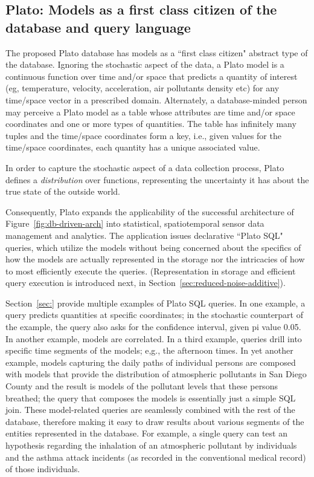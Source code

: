 \subsection{Plato: Models as a first class citizen of the database and query language}
\label{sec:plato}
The proposed Plato database has models as a ``first class citizen"
abstract type of the database. Ignoring the stochastic aspect of the
data, a Plato model is a continuous function over time and/or space
that predicts a quantity of interest (eg, temperature, velocity,
acceleration, air pollutants density etc) for any time/space vector in
a prescribed domain. Alternately, a database-minded person may
perceive a Plato model as a table whose attributes are time and/or
space coordinates and one or more types of quantities. The table has
infinitely many tuples and the time/space coordinates form a key,
i.e., given values for the time/space coordinates, each quantity has a
unique associated value.  

In order to capture the stochastic aspect of a data collection
process, Plato defines a {\em distribution} over functions,
representing the uncertainty it has about the true state of the
outside world.


Consequently, Plato expands the applicability of the successful
architecture of Figure~\ref{fig:db-driven-arch} into statistical,
spatiotemporal sensor data management and analytics. The application
issues declarative ``Plato SQL" queries, which utilize the models
without being concerned about the specifics of how the models are
actually represented in the storage nor the intricacies of how to most
efficiently execute the queries. (Representation in storage and
efficient query execution is introduced next, in
Section~\ref{sec:reduced-noise-additive}). 

Section~\ref{sec:} provide multiple examples of Plato SQL queries. In one example, a query predicts quantities at specific coordinates; in the stochastic counterpart of the example, the query also asks for the confidence interval, given pi value 0.05. In another example, models are correlated. In a third example, queries drill into specific time segments of the models; e,g., the afternoon times. In yet another example, models capturing the daily paths of individual persons are composed with models that provide the distribution of atmospheric pollutants in San Diego County and the result is models of the pollutant levels that these persons breathed; the query that composes the models is essentially just a simple SQL join. These model-related queries are seamlessly combined with the rest of the database, therefore making it easy to draw results about various segments of the entities represented in the database. For example, a single query can test an hypothesis regarding the inhalation of an atmospheric pollutant by individuals and the asthma attack incidents (as recorded in the conventional medical record) of those individuals.

